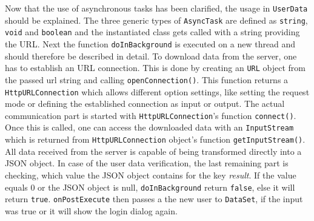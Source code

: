 Now  that the use of asynchronous tasks has been clarified, the usage in \lstinline$UserData$ should be explained. The three generic types of \lstinline$AsyncTask$ are defined as \lstinline$string$, \lstinline$void$ and \lstinline$boolean$ and the instantiated class gets called with a string providing the URL. Next the function \lstinline$doInBackground$ is executed on a new thread and should therefore be described in detail. To download data from the server, one has to establish an URL connection. This is done by creating an \lstinline$URL$ object from the passed url string and calling \lstinline$openConnection()$. This function returns a \lstinline$HttpURLConnection$ which allows different option settings, like setting the request mode or defining the established connection as input or output. The actual communication part is started with \lstinline$HttpURLConnection$'s function \lstinline$connect()$. Once this is called, one can access the downloaded data with an \lstinline$InputStream$ which is returned from \lstinline$HttpURLConnection$ object's function \lstinline$getInputStream()$. All data received from the server is capable of being transformed directly into a JSON object. In case of the user data verification, the last remaining part is checking, which value the JSON object contains for the key \emph{result}. If the value equals 0 or the JSON object is null, \lstinline$doInBackground$ return \lstinline$false$, else it will return \lstinline$true$. \lstinline$onPostExecute$ then passes a the new user to \lstinline$DataSet$, if the input was true or it will show the login dialog again.

